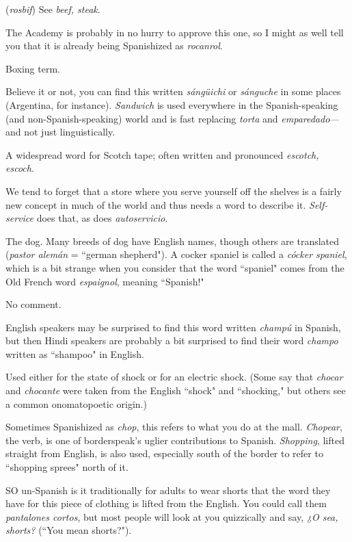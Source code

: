  (\emph{rosbif}) See \emph{beef, steak}.

 The Academy is probably in no
hurry to approve this one, so I might as well tell you that it is already being Spanishized as \emph{rocanrol}.

 Boxing term.

 Believe it or not, you can find this written \emph{sángüichi} or \emph{sánguche} in some places (Argentina, for instance). \emph{Sandwich} is used everywhere in the Spanish-speaking (and non-Spanish-speaking) world and is fast replacing \emph{torta} and \emph{emparedado}---and not
just linguistically.

 A widespread word for Scotch tape; often written
and pronounced \emph{escotch, escoch}.

 We tend to forget that a store where you serve
yourself off the shelves is a fairly new concept in much of the world
and thus needs a word to describe it. \emph{Self-service} does that, as does
\emph{autoservicio}.

 The dog. Many breeds of dog have English names,
though others are translated (\emph{pastor alemán} = ``german shepherd"). A
cocker spaniel is called a \emph{cócker spaniel}, which is a bit strange when
you consider that the word ``spaniel" comes from the Old French word
\emph{espaignol}, meaning ``Spanish!"

 No comment.

 English speakers may be surprised to find this
word written \emph{champú} in Spanish, but then Hindi speakers are probably
a bit surprised to find their word \emph{champo} written as ``shampoo" in
English.

 Used either for the state of shock or for an electric
shock. (Some say that \emph{chocar} and \emph{chocante} were taken from the English ``shock" and ``shocking," but others see a common onomatopoetic origin.)

 Sometimes Spanishized as \emph{chop}, this refers to what
you do at the mall. \emph{Chopear}, the verb, is one of borderspeak's uglier
contributions to Spanish. \emph{Shopping}, lifted straight from English, is also
used, especially south of the border to refer to ``shopping sprees" north
of it.

 SO un-Spanish is it traditionally for adults to wear
shorts that the word they have for this piece of clothing is lifted
from the English. You could call them \emph{pantalones cortos}, but most
people will look at you quizzically and say, \emph{¿O sea, shorts?} (``You mean
shorts?").

